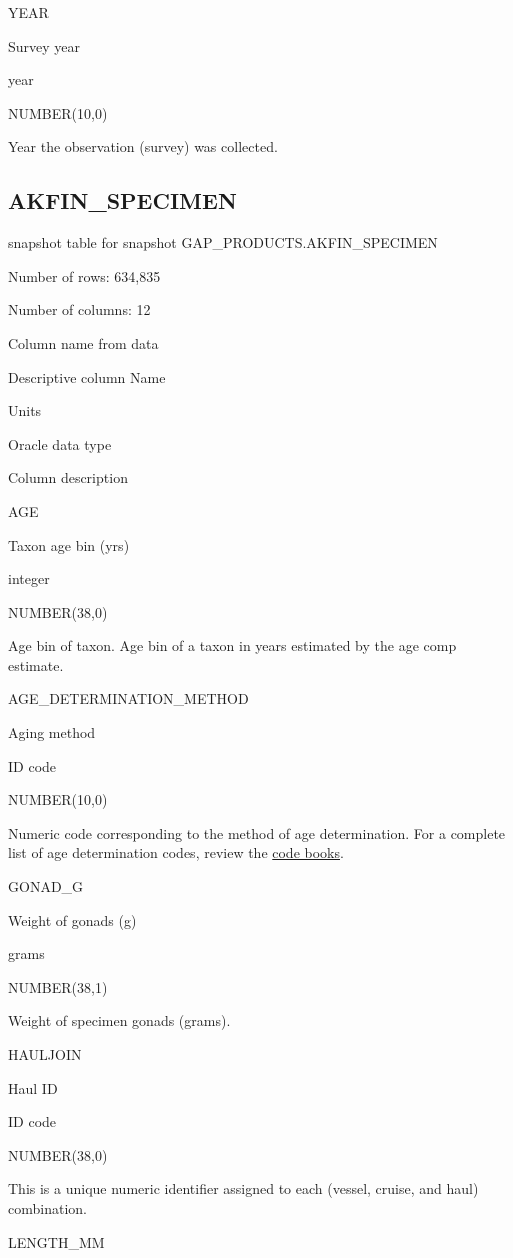 \documentclass[
  letterpaper,
  oneside,
  open=any]{scrbook}
\begin{document}
YEAR

Survey year

year

NUMBER(10,0)

Year the observation (survey) was collected.

\hypertarget{akfin_specimen}{%
\subsection{AKFIN\_SPECIMEN}\label{akfin_specimen}}

snapshot table for snapshot GAP\_PRODUCTS.AKFIN\_SPECIMEN

Number of rows: 634,835

Number of columns: 12

Column name from data

Descriptive column Name

Units

Oracle data type

Column description

AGE

Taxon age bin (yrs)

integer

NUMBER(38,0)

Age bin of taxon. Age bin of a taxon in years estimated by the age comp
estimate.

AGE\_DETERMINATION\_METHOD

Aging method

ID code

NUMBER(10,0)

Numeric code corresponding to the method of age determination. For a
complete list of age determination codes, review the
\href{https://www.fisheries.noaa.gov/resource/document/groundfish-survey-species-code-manual-and-data-codes-manual}{code
books}.

GONAD\_G

Weight of gonads (g)

grams

NUMBER(38,1)

Weight of specimen gonads (grams).

HAULJOIN

Haul ID

ID code

NUMBER(38,0)

This is a unique numeric identifier assigned to each (vessel, cruise,
and haul) combination.

LENGTH\_MM
\end{document}

